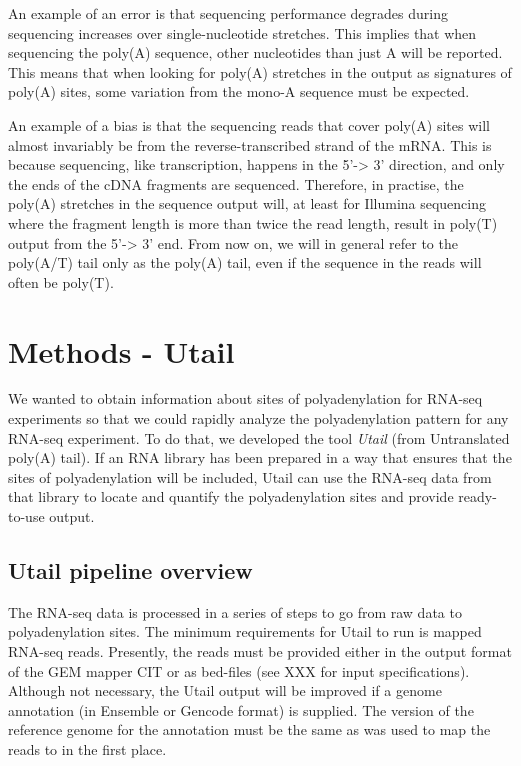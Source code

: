 An example of an error is that sequencing performance degrades during
sequencing increases over single-nucleotide stretches. This implies that when
sequencing the poly(A) sequence, other nucleotides than just A will be
reported. This means that when looking for poly(A) stretches in the output as
signatures of poly(A) sites, some variation from the mono-A sequence must be
expected.

An example of a bias is that the sequencing reads that cover poly(A) sites will
almost invariably be from the reverse-transcribed strand of the mRNA. This is
because sequencing, like transcription, happens in the 5'-> 3' direction, and
only the ends of the cDNA fragments are sequenced. Therefore, in practise, the
poly(A) stretches in the sequence output will, at least for Illumina sequencing
where the fragment length is more than twice the read length, result in
poly(T) output from the 5'-> 3' end. From now on, we will in general refer to
the poly(A/T) tail only as the poly(A) tail, even if the sequence in the reads
will often be poly(T).

\section{Methods - Utail}
We wanted to obtain information about sites of polyadenylation for RNA-seq
experiments so that we could rapidly analyze the polyadenylation pattern for
any RNA-seq experiment. To do that, we developed the tool \textit{Utail} (from
Untranslated poly(A) tail). If an RNA library has been prepared in a way that
ensures that the sites of polyadenylation will be included, Utail can use the
RNA-seq data from that library to locate and quantify the polyadenylation sites
and provide ready-to-use output.

\subsection{Utail pipeline overview}
The RNA-seq data is processed in a series of steps to go from raw data to
polyadenylation sites. The minimum requirements for Utail to run is mapped
RNA-seq reads. Presently, the reads must be provided either in the output
format of the GEM mapper CIT or as bed-files (see XXX for input
specifications). Although not necessary, the Utail output will be improved if a
genome annotation (in Ensemble or Gencode format) is supplied. The version of
the reference genome for the annotation must be the same as was used to map the
reads to in the first place.

